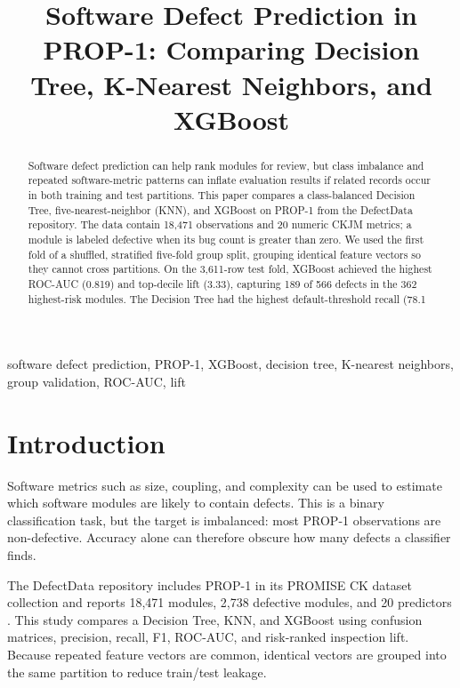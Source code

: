 \documentclass[conference]{IEEEtran}
\title{Software Defect Prediction in PROP-1: Comparing Decision Tree, K-Nearest Neighbors, and XGBoost}
\author{\IEEEauthorblockN{Aditya Dubey}}
\begin{document}
\maketitle

\begin{abstract}
Software defect prediction can help rank modules for review, but class imbalance and repeated software-metric patterns can inflate evaluation results if related records occur in both training and test partitions. This paper compares a class-balanced Decision Tree, five-nearest-neighbor (KNN), and XGBoost on PROP-1 from the DefectData repository. The data contain 18,471 observations and 20 numeric CKJM metrics; a module is labeled defective when its bug count is greater than zero. We used the first fold of a shuffled, stratified five-fold group split, grouping identical feature vectors so they cannot cross partitions. On the 3,611-row test fold, XGBoost achieved the highest ROC-AUC (0.819) and top-decile lift (3.33), capturing 189 of 566 defects in the 362 highest-risk modules. The Decision Tree had the highest default-threshold recall (78.1%
\end{abstract}

\begin{IEEEkeywords}
software defect prediction, PROP-1, XGBoost, decision tree, K-nearest neighbors, group validation, ROC-AUC, lift
\end{IEEEkeywords}

\section{Introduction}
Software metrics such as size, coupling, and complexity can be used to estimate which software modules are likely to contain defects. This is a binary classification task, but the target is imbalanced: most PROP-1 observations are non-defective. Accuracy alone can therefore obscure how many defects a classifier finds.

The DefectData repository includes PROP-1 in its PROMISE CK dataset collection and reports 18,471 modules, 2,738 defective modules, and 20 predictors \cite{defectdata}. This study compares a Decision Tree, KNN, and XGBoost using confusion matrices, precision, recall, F1, ROC-AUC, and risk-ranked inspection lift. Because repeated feature vectors are common, identical vectors are grouped into the same partition to reduce train/test leakage.
\end{document}
